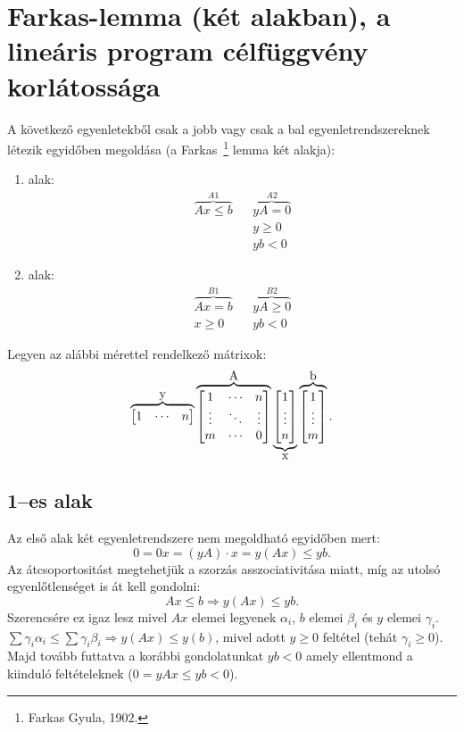 \newpage
\section{Farkas-lemma (két alakban), a lineáris program célfüggvény korlátossága}

A következő egyenletekből csak a jobb vagy csak a bal egyenletrendszereknek
létezik egyidőben megoldása (a Farkas~\footnote{Farkas Gyula, 1902.} lemma két
alakja):

\begin{enumerate}
  \item alak: \begin{align*}
  \overbrace{Ax \leq b}^{A1}  && \overbrace{yA= 0}^{A2}\\
   			 && y\geq 0 \\
             && yb< 0
  \end{align*}
  \item alak:\begin{align*}
  \overbrace{Ax = b }^{B1}   && \overbrace{yA \geq 0}^{B2}\\
  x \geq 0 && yb < 0 
  \end{align*}
\end{enumerate}

Legyen az alábbi mérettel rendelkező mátrixok:
\[
\overbrace{\begin{bmatrix} 1 &  \cdots &  n \end{bmatrix}}^{\hbox{y}} 
\overbrace{\begin{bmatrix} 1 & \cdots & n \\ \vdots & \ddots & \vdots \\ m  & \cdots & 0 \end{bmatrix}}^{\hbox{A}}
\underbrace{\begin{bmatrix} 1 \\ \vdots \\  n \end{bmatrix}}_{\hbox{x}}
\overbrace{\begin{bmatrix} 1 \\ \vdots \\  m \end{bmatrix}}^{\hbox{b}}.
\]

\subsection{1--es alak}
Az első alak két egyenletrendszere nem megoldható egyidőben mert:
\[ 0 = 0x = (yA) \cdot x = y(Ax) \leq yb.\] Az átcsoportositást megtehetjük a
szorzás asszociativitása miatt, míg az utolsó egyenlőtlenséget is át kell
gondolni: \[ Ax \leq b \Rightarrow y(Ax) \leq yb.\] Szerencsére ez igaz lesz
mivel $Ax$ elemei legyenek $\alpha_i$, $b$ elemei $\beta_i$ és $y$ elemei
$\gamma_i$.
$\sum\gamma_i \alpha_i \leq \sum \gamma_i \beta_i \Rightarrow y(Ax) \leq y(b)$,
mivel adott $y \geq 0$ feltétel (tehát $\gamma_i \geq 0$). Majd tovább futtatva a
korábbi gondolatunkat $yb<0$ amely ellentmond a kiinduló feltételeknek ($0=yAx \leq yb<0$). 

